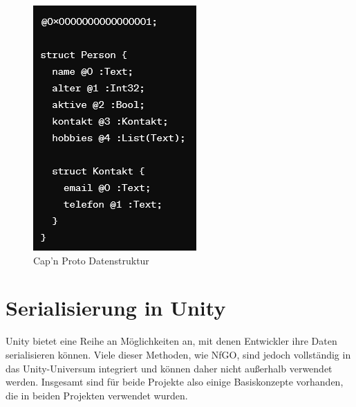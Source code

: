 \begin{figure}[h]
\begin{minipage}{0.35\textwidth}
		\includegraphics[width=\textwidth]{figures/capnprotoexample.png}
		\caption{Cap'n Proto Datenstruktur}
		\label{fig:capnproto}
	\end{minipage}\hfill
	
\end{figure}

\newpage

\section{Serialisierung in Unity}

Unity bietet eine Reihe an Möglichkeiten an, mit denen Entwickler ihre Daten serialisieren können. Viele dieser Methoden, wie NfGO, sind jedoch vollständig in das Unity-Universum integriert und können daher nicht außerhalb verwendet werden. Insgesamt sind für beide Projekte also einige Basiskonzepte vorhanden, die in beiden Projekten verwendet wurden.

